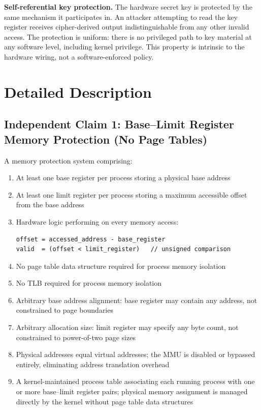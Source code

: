 \documentclass[12pt,letterpaper]{article}
\begin{document}
\textbf{Self-referential key protection.}
The hardware secret key is protected by the same mechanism it participates in.
An attacker attempting to read the key register receives cipher-derived output
indistinguishable from any other invalid access.
The protection is uniform: there is no privileged path to key material at any
software level, including kernel privilege.
This property is intrinsic to the hardware wiring, not a software-enforced policy.

\section{Detailed Description}

\subsection*{Independent Claim 1: Base--Limit Register Memory Protection
  (No Page Tables)}

A memory protection system comprising:

\begin{enumerate}[label=(\alph*),noitemsep]
  \item At least one base register per process storing a physical base address
  \item At least one limit register per process storing a maximum accessible
        offset from the base address
  \item Hardware logic performing on every memory access:
        \begin{lstlisting}
offset = accessed_address - base_register
valid  = (offset < limit_register)   // unsigned comparison
        \end{lstlisting}
  \item No page table data structure required for process memory isolation
  \item No TLB required for process memory isolation
  \item Arbitrary base address alignment: base register may contain any address,
        not constrained to page boundaries
  \item Arbitrary allocation size: limit register may specify any byte count,
        not constrained to power-of-two page sizes
  \item Physical addresses equal virtual addresses; the MMU is disabled or
        bypassed entirely, eliminating address translation overhead
  \item A kernel-maintained process table associating each running process with
        one or more base--limit register pairs; physical memory assignment is
        managed directly by the kernel without page table data structures
\end{enumerate}
\end{document}
